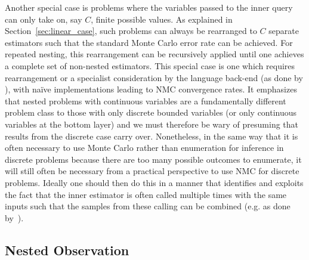 Another special case is problems where the variables passed to the inner query can only take on, say $C$, finite
possible values. As
explained in Section~\ref{sec:linear_case}, such problems can always be rearranged to
$C$ separate estimators such that the standard Monte Carlo error rate can be achieved.
For repeated nesting, this rearrangement can be recursively applied until one achieves
a complete set of non-nested estimators.  This special case is one which requires rearrangement
or a specialist consideration by the language back-end (as done by \cite{stuhlmuller2012dynamic,stuhlmuller2014reasoning,cornish2017efficient}),
with na\"{i}ve implementations leading to NMC convergence rates.  It emphasizes that
nested problems with continuous variables are a fundamentally different problem
class to those with only discrete bounded variables (or only continuous variables at the bottom layer)
and we must therefore be wary of presuming that results from the discrete case carry over.
Nonetheless, in the same way that it is often necessary to use Monte Carlo rather than enumeration
for inference in discrete problems because there are too many possible outcomes to enumerate, 
it will still often be necessary from a practical perspective
to use NMC for discrete problems. Ideally one should then do this in a manner that identifies and exploits the fact that
the inner estimator is often called multiple times with the same inputs such that the samples
from these calling can be combined (e.g. as done by~\cite{stuhlmuller2012dynamic}).

\subsection{Nested Observation}
\label{sec:nest:imp:obs}

